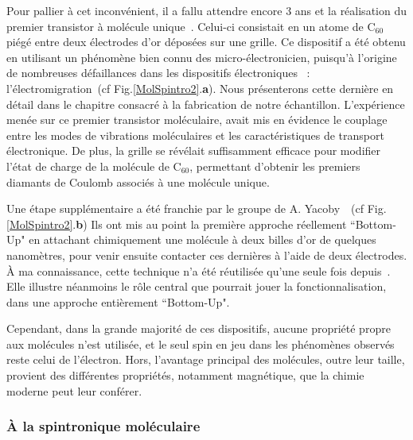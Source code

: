 Pour pallier à cet inconvénient, il a fallu attendre encore 3 ans et la réalisation du premier transistor à molécule unique~\cite{Park2000}. Celui-ci consistait en un atome de C$_{60}$ piégé entre deux électrodes d'or déposées sur une grille. Ce dispositif a été obtenu en utilisant un phénomène bien connu des micro-électronicien, puisqu'à l'origine de nombreuses défaillances dans les dispositifs électroniques~\cite{Ho1989,Tu1992} : l'électromigration~(cf Fig.\ref{MolSpintro2}.\textbf{a}). Nous présenterons cette dernière en détail dans le chapitre consacré à la fabrication de notre échantillon. 
L'expérience menée sur ce premier transistor moléculaire, avait mis en évidence le couplage entre les modes de vibrations moléculaires et les caractéristiques de transport électronique. De plus, la grille se révélait suffisamment efficace pour modifier l'état de charge de la molécule de C$_{60}$, permettant d'obtenir les premiers diamants de Coulomb associés à une molécule unique.

Une étape supplémentaire a été franchie par le groupe de A. Yacoby~\cite{Dadosh2005}~(cf Fig.\ref{MolSpintro2}.\textbf{b}) Ils ont mis au point la première approche réellement ``Bottom-Up" en attachant chimiquement une molécule à deux billes d'or de quelques nanomètres, pour venir ensuite contacter ces dernières à l'aide de deux électrodes. \`A ma connaissance, cette technique n'a été réutilisée qu'une seule fois depuis~\cite{Jain2009}. Elle illustre néanmoins le rôle central que pourrait jouer la fonctionnalisation, dans une approche entièrement ``Bottom-Up".

Cependant, dans la grande majorité de ces dispositifs, aucune propriété propre aux molécules n'est utilisée, et le seul spin en jeu dans les phénomènes observés reste celui de l'électron. Hors, l'avantage principal des molécules, outre leur taille, provient des différentes propriétés, notamment magnétique, que la chimie moderne peut leur conférer.

\subsubsection*{\`A la spintronique moléculaire}

